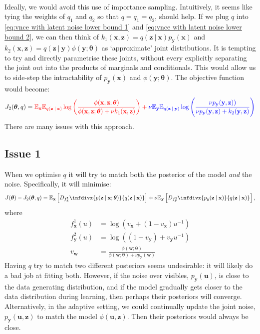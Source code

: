 \documentclass[11pt, oneside]{article}
\newcommand{\thetab}{{\boldsymbol{\theta}}}
\newcommand{\pnn}{\phi}
\newcommand{\pnoise}{p_{ \mathbf y}}
\renewcommand{\u}{{\mathbf u}}
\newcommand{\x}{{\mathbf x}}
\newcommand{\y}{{\mathbf y}}
\newcommand{\z}{{\mathbf z}}
\newcommand{\w}{{\mathbf w}}
\newcommand{\E}{\mathbb{E}}
\newcommand{\Ex}{\E_{\x}}
\newcommand{\Ey}{\E_{\y}}
\newcommand\given[1][]{\:#1\vert\:}
\newcommand{\infdiv}[1]{D_{#1}\infdivx}
\theoremstyle{definition}
\begin{document}
{\begin{align}
\end{align}
Ideally, we would avoid this use of importance sampling. Intuitively, it seems like tying the weights of $q_1$ and $q_2$ so that $q = q_1 = q_2$, should help. If we plug $q$ into \ref{eq:vnce with latent noise lower bound 1} and \ref{eq:vnce with latent noise lower bound 2}, we can then think of $k_1(\x, \z) = q(\z \given\x)\pnoise(\x)$ and $k_2(\x, \z) = q(\z \given \y) \pnn(\y ; \thetab)$ as `approximate' joint distributions. It is tempting to try and directly parametrise these joints, without every explicitly separating the joint out into the products of marginals and conditionals. This would allow us to side-step the intractability of $\pnoise(\x)$ and $\pnn(\y; \thetab)$. The objective function would become:
\begin{align}
\label{eq:variational noise objective function}
    J_2(\thetab, q) = \color{red}{\Ex \mathbb{E}_{q(\z \given \x)} \log \left( \frac{\pnn(\x,\z; \thetab)}{\pnn(\x,\z; \thetab) + \nu k_1(\x, \z)} \right)}
    + \color{blue}{ \nu \Ey \mathbb{E}_{q(\z \given \y)} \log \left( \frac{\nu \pnoise(\y, \z))}{\nu \pnoise(\y, \z) +  k_2(\y, \z) } \right)}
\end{align}
There are many issues with this approach. 

\subsection*{Issue 1}
When we optimise $q$ it will try to match both the posterior of the model \emph{and} the noise. Specifically, it will minimise:
\begin{equation}
        J(\thetab) - J_2(\thetab, q) = \Ex \left[ \infdiv{f^1_{\x}}{p(\z \given \x; \thetab)}{q(\z \given \x)} \right] + \nu  \Ey \left[ \infdiv{f^2_{\y}}{p_y(\z \given \x)}{q(\z \given \x)} \right],
    \end{equation}
where
\begin{align}
    f^1_{\x}(u) &= \log(v_{\x} + (1 - v_{\x})u^{-1}) \\
    f^2_{\y}(u) &= \log((1 - v_{\y}) + v_{\y}u^{-1}) \\
    v_{\w} &= \frac{\pnn(\textbf{w}; \thetab)}{\pnn(\textbf{w}; \thetab) + \nu \pnoise(\textbf{w})}
\end{align}
Having $q$ try to match two different posteriors seems undesirable: it will likely do a bad job at fitting both. However, if the noise over visibles, $\pnoise(\u)$, is close to the data generating distribution, and if the model gradually gets closer to the data distribution during learning, then perhaps their posteriors will converge. Alternatively, in the adaptive setting, we could continually update the joint noise, $\pnoise(\u, \z)$ to match the model $\pnn(\u, \z)$. Then their posteriors would always be close. 

}
\end{document}
